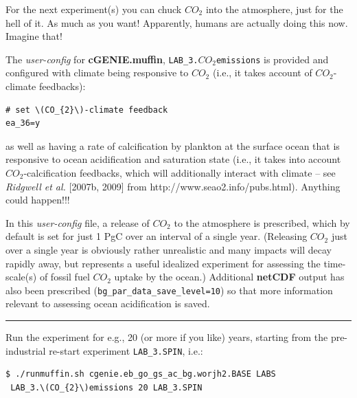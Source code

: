 \documentclass[11pt,fleqn]{book} %
\begin{document}
For the next experiment(s) you can chuck \(CO_{2}\) into the atmosphere, just for the hell of it. As much as you want! Apparently, humans are actually doing this now. Imagine that!

The \textit{user-config} for \textbf{cGENIE.muffin}, \texttt{LAB\_3.\(CO_{2}\)emissions} is provided and configured with climate being responsive to \(CO_{2}\) (i.e., it takes account of \(CO_{2}\)-climate feedbacks): 

\vspace{-2pt}\begin{verbatim}
# set \(CO_{2}\)-climate feedback
ea_36=y
\end{verbatim}\vspace{-2pt}

\noindent as well as having a rate of calcification by plankton at the surface ocean that is responsive to ocean acidification and saturation state (i.e., it takes into account \(CO_{2}\)-calcification feedbacks, which will additionally interact with climate – see \textit{Ridgwell et al.} [2007b, 2009] from http://www.seao2.info/pubs.html). Anything could happen!!!

In this \textit{user-config} file, a release of \(CO_{2}\) to the atmosphere is prescribed, which by default is set for just 1 PgC over an interval of a single year. (Releasing \(CO_{2}\) just over a single year is obviously rather unrealistic and many impacts will decay rapidly away, but represents a useful idealized experiment for assessing the time-scale(s) of fossil fuel \(CO_{2}\) uptake by the ocean.) Additional \textbf{netCDF} output has also been prescribed (\texttt{bg\_par\_data\_save\_level=10}) so that more information relevant to assessing ocean acidification is saved.

\vspace{1mm}
\noindent\rule{4cm}{0.1mm}
\vspace{2mm}

\noindent Run the experiment for e.g., 20 (or more if you like) years, starting from the pre-industrial re-start experiment \texttt{LAB\_3.SPIN}, i.e.: 

\vspace{-2pt}\begin{verbatim}
$ ./runmuffin.sh cgenie.eb_go_gs_ac_bg.worjh2.BASE LABS
 LAB_3.\(CO_{2}\)emissions 20 LAB_3.SPIN
\end{verbatim}\vspace{-2pt}
\end{document}
